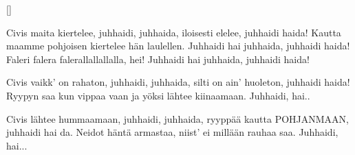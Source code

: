 
[]
  
\beginverse*
Civis maita kiertelee, juhhaidi, juhhaida,
iloisesti elelee, juhhaidi haida!
Kautta maamme pohjoisen
kiertelee hän laulellen.
Juhhaidi hai juhhaida, juhhaidi haida!
Faleri falera falerallallallalla, hei!
Juhhaidi hai juhhaida, juhhaidi haida!
\endverse

\beginverse*
Civis vaikk' on rahaton, juhhaidi, juhhaida,
silti on ain' huoleton, juhhaidi haida!
Ryypyn saa kun vippaa vaan
ja yöksi lähtee kiinaamaan.
Juhhaidi, hai..
\endverse

\beginverse*
Civis lähtee hummaamaan, juhhaidi, juhhaida,
ryyppää kautta POHJANMAAN,
juhhaidi hai da.
Neidot häntä armastaa,
niist' ei millään rauhaa saa.
Juhhaidi, hai...
\endverse
\endsong
